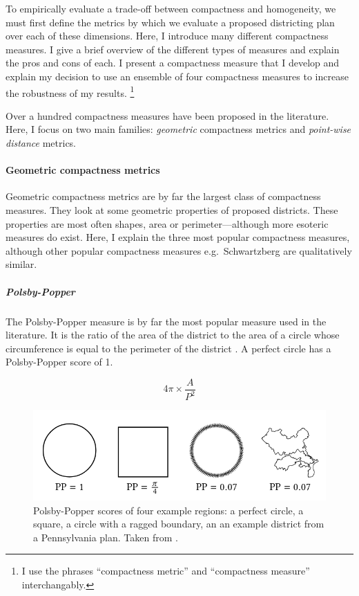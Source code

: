 \documentclass[]{article}
\let\oldparagraph\paragraph
\renewcommand{\paragraph}[1]{\oldparagraph{#1}\mbox{}}
\let\oldsubparagraph\subparagraph
\renewcommand{\subparagraph}[1]{\oldsubparagraph{#1}\mbox{}}
\begin{document}
To empirically evaluate a trade-off between compactness and homogeneity,
we must first define the metrics by which we evaluate a proposed
districting plan over each of these dimensions. Here, I introduce many
different compactness measures. I give a brief overview of the different
types of measures and explain the pros and cons of each. I present a
compactness measure that I develop and explain my decision to use an
ensemble of four compactness measures to increase the robustness of my
results. \footnote{I use the phrases ``compactness metric'' and
  ``compactness measure'' interchangably.}

Over a hundred compactness measures have been proposed in the
literature. Here, I focus on two main families: \emph{geometric}
compactness metrics and \emph{point-wise distance} metrics.

\hypertarget{geometric-compactness-metrics}{%
\paragraph{Geometric compactness
metrics}\label{geometric-compactness-metrics}}

Geometric compactness metrics are by far the largest class of
compactness measures. They look at some geometric properties of proposed
districts. These properties are most often shapes, area or
perimeter---although more esoteric measures do exist. Here, I explain
the three most popular compactness measures, although other popular
compactness measures e.g.~Schwartzberg are qualitatively similar.

\hypertarget{polsby-popper}{%
\subparagraph{Polsby-Popper}\label{polsby-popper}}

The Polsby-Popper measure is by far the most popular measure used in the
literature. It is the ratio of the area of the district to the area of a
circle whose circumference is equal to the perimeter of the district
\citep{pp1991}. A perfect circle has a Polsby-Popper score of 1.

\[4\pi \times \frac{A}{P^2}\]

\begin{figure}
\centering
\includegraphics{img/pp_example.png}
\caption{Polsby-Popper scores of four example regions: a perfect circle,
a square, a circle with a ragged boundary, an an example district from a
Pennsylvania plan. Taken from \cite{s2020}.}
\end{figure}
\end{document}
